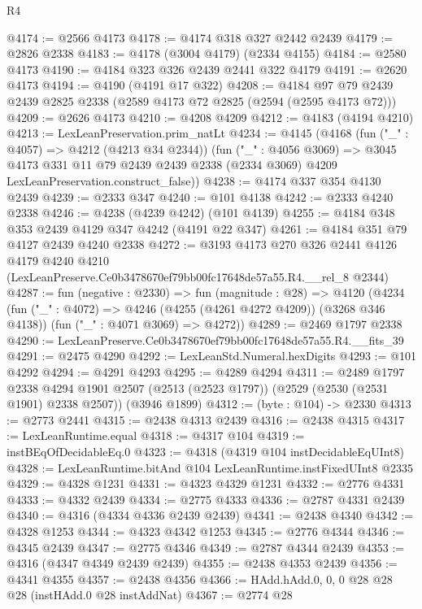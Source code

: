 \begin{lexlean}{R4}
\begin{coremodule}
@4174 := @2566 @4173
@4178 := @4174 @318 @327 @2442 @2439
@4179 := @2826 @2338
@4183 := @4178 (@3004 @4179) (@2334 @4155)
@4184 := @2580 @4173
@4190 := @4184 @323 @326 @2439 @2441 @322 @4179
@4191 := @2620 @4173
@4194 := @4190 (@4191 @17 @322)
@4208 := @4184 @97 @79 @2439 @2439 @2825 @2338 (@2589 @4173 @72 @2825 (@2594 (@2595 @4173 @72)))
@4209 := @2626 @4173
@4210 := @4208 @4209
@4212 := @4183 (@4194 @4210)
@4213 := LexLeanPreservation.prim_natLt
@4234 := @4145
    (@4168
      (fun ("_" : @4057) => @4212 (@4213 @34 @2344))
      (fun ("_" : @4056 @3069) =>
      @3045
        @4173
        @331
        @11
        @79
        @2439
        @2439
        @2338
        (@2334 @3069)
        @4209
        LexLeanPreservation.construct_false))
@4238 := @4174 @337 @354 @4130 @2439
@4239 := @2333 @347
@4240 := @101 @4138
@4242 := @2333 @4240 @2338
@4246 := @4238 (@4239 @4242) (@101 @4139)
@4255 := @4184 @348 @353 @2439 @4129 @347 @4242 (@4191 @22 @347)
@4261 := @4184 @351 @79 @4127 @2439 @4240 @2338
@4272 := @3193
    @4173
    @270
    @326
    @2441
    @4126
    @4179
    @4240
    @4210
    (LexLeanPreserve.Ce0b3478670ef79bb00fc17648de57a55.R4.__rel_8 @2344)
@4287 := fun (negative : @2330) =>
  fun (magnitude : @28) =>
  @4120
    (@4234
      (fun ("_" : @4072) => @4246 (@4255 (@4261 @4272 @4209)) (@3268 @346 @4138))
      (fun ("_" : @4071 @3069) => @4272))
@4289 := @2469 @1797 @2338
@4290 := LexLeanPreserve.Ce0b3478670ef79bb00fc17648de57a55.R4.__fits_39
@4291 := @2475 @4290
@4292 := LexLeanStd.Numeral.hexDigits
@4293 := @101 @4292
@4294 := @4291 @4293
@4295 := @4289 @4294
@4311 := @2489
    @1797
    @2338
    @4294
    @1901
    @2507
    (@2513 (@2523 @1797))
    (@2529 (@2530 (@2531 @1901) @2338 @2507))
    (@3946 @1899)
@4312 := (byte : @104) -> @2330
@4313 := @2773 @2441
@4315 := @2438 @4313 @2439
@4316 := @2438 @4315
@4317 := LexLeanRuntime.equal
@4318 := @4317 @104
@4319 := instBEqOfDecidableEq.{0}
@4323 := @4318 (@4319 @104 instDecidableEqUInt8)
@4328 := LexLeanRuntime.bitAnd @104 LexLeanRuntime.instFixedUInt8 @2335
@4329 := @4328 @1231
@4331 := @4323 @4329 @1231
@4332 := @2776 @4331
@4333 := @4332 @2439
@4334 := @2775 @4333
@4336 := @2787 @4331 @2439
@4340 := @4316 (@4334 @4336 @2439 @2439)
@4341 := @2438 @4340
@4342 := @4328 @1253
@4344 := @4323 @4342 @1253
@4345 := @2776 @4344
@4346 := @4345 @2439
@4347 := @2775 @4346
@4349 := @2787 @4344 @2439
@4353 := @4316 (@4347 @4349 @2439 @2439)
@4355 := @2438 @4353 @2439
@4356 := @4341 @4355
@4357 := @2438 @4356
@4366 := HAdd.hAdd.{0, 0, 0} @28 @28 @28 (instHAdd.{0} @28 instAddNat)
@4367 := @2774 @28

\end{coremodule}
\end{lexlean}
